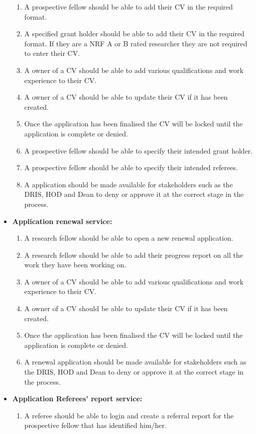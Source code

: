 \documentclass[12pt]{article}
\begin{document}
\begin{itemize}
\begin{enumerate}
			\item A prospective fellow should be able to add their CV in the required format.
			\item A specified grant holder should be able to add their CV in the required format. If they are a NRF A or B rated researcher they are not required to enter their CV.
			\item A owner of a CV should be able to add various qualifications and work experience to their CV. 
			\item A owner of a CV should be able to update their CV if it has been created. 
			\item Once the application has been finalised the CV will be locked until the application is complete or denied.
			\item A prospective fellow should be able to specify their intended grant holder.	
			\item A prospective fellow should be able to specify their intended referees.				
			\item A application should be made available for stakeholders such as the DRIS, HOD and Dean to deny or approve it at the correct stage in the process. 		
		\end{enumerate}			
		\item\textbf{ Application renewal service:}
		\begin{enumerate}					
			\item A research fellow should be able to open a new renewal application. 
			\item A research fellow should be able to add their progress report on all the work they have been working on.	
			\item A owner of a CV should be able to add various qualifications and work experience to their CV. 
			\item A owner of a CV should be able to update their CV if it has been created. 
			\item Once the application has been finalised the CV will be locked until the application is complete or denied.
			\item A renewal application should be made available for stakeholders such as the DRIS, HOD and Dean to deny or approve it at the correct stage in the process.							 					
		\end{enumerate}
		\item \textbf{Application Referees' report service:}
		\begin{enumerate}		
			\item A referee should be able to login and create a referral report for the prospective fellow that has identified him/her.				 					

\end{enumerate}
\end{itemize}
\end{document}
